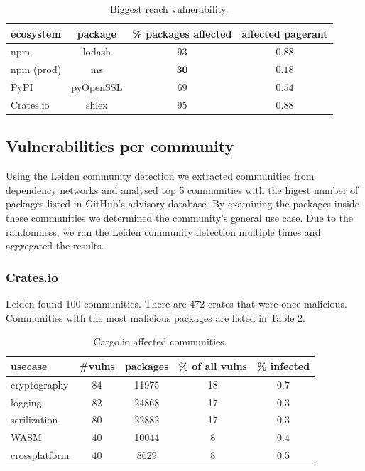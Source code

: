 \documentclass[9pt,twocolumn,twoside]{pnas-report}
\begin{document}
\begin{table}[h]\centering%
	\caption{Biggest reach vulnerability.}
	\begin{tabular}{l|ccc}
		ecosystem  & package   & \% packages affected & affected pagerant \\\hline
		npm        & lodash    & $93$                 & $0.88$            \\
		npm (prod) & ms        & $\mathbf{30}$        & $\mathbf{0.18}$   \\
		PyPI       & pyOpenSSL & $69$                 & $0.54$            \\
		Crates.io  & shlex     & $95$                 & $0.88$            \\
	\end{tabular}
	\label{tab:highest_reach}
\end{table}

\subsection*{Vulnerabilities per community}
Using the Leiden community detection we extracted communities from dependency networks and analysed top 5 communities with the higest number of packages listed in GitHub's advisory database.
By examining the packages inside these communities we determined the community's general use case.
Due to the randomness, we ran the Leiden community detection multiple times and aggregated the results.

\subsubsection*{Crates.io}
Leiden found 100 communities. There are 472 crates that were once malicious. Communities with the most malicious packages are listed in Table \ref{tab:cargo_comms}.
\begin{table}[h]\centering%
	\caption{Cargo.io affected communities.}
	\begin{tabular}{l|cccc}
		usecase       & \#vulns & packages & \% of all vulns & \% infected \\\hline
		cryptography  & 84      & 11975    & 18              & 0.7         \\
		logging       & 82      & 24868    & 17              & 0.3         \\
		serilization  & 80      & 22882    & 17              & 0.3         \\
		WASM          & 40      & 10044    & 8               & 0.4         \\
		crossplatform & 40      & 8629     & 8               & 0.5         \\
	\end{tabular}
	\label{tab:cargo_comms}
\end{table}
\end{document}
